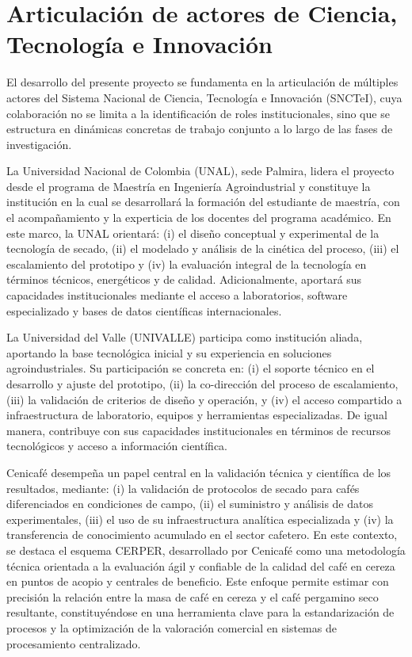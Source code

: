 \section{Articulación de actores de Ciencia, Tecnología e Innovación}

El desarrollo del presente proyecto se fundamenta en la articulación de múltiples 
actores del Sistema Nacional de Ciencia, Tecnología e Innovación (SNCTeI), cuya 
colaboración no se limita a la identificación de roles institucionales, sino que se 
estructura en dinámicas concretas de trabajo conjunto a lo largo de las fases de 
investigación.

La Universidad Nacional de Colombia (UNAL), sede Palmira, lidera el proyecto desde el 
programa de Maestría en Ingeniería Agroindustrial y constituye la institución en la cual 
se desarrollará la formación del estudiante de maestría, con el acompañamiento y la 
experticia de los docentes del programa académico. En este marco, la UNAL orientará: 
(i) el diseño conceptual y experimental de la tecnología de secado, (ii) el modelado y 
análisis de la cinética del proceso, (iii) el escalamiento del prototipo y (iv) la 
evaluación integral de la tecnología en términos técnicos, energéticos y de calidad. 
Adicionalmente, aportará sus capacidades institucionales mediante el acceso a laboratorios, 
software especializado y bases de datos científicas internacionales.

La Universidad del Valle (UNIVALLE) participa como institución aliada, aportando la base 
tecnológica inicial y su experiencia en soluciones agroindustriales. Su participación se 
concreta en: (i) el soporte técnico en el desarrollo y ajuste del prototipo, (ii) la 
co-dirección del proceso de escalamiento, (iii) la validación de criterios de diseño y 
operación, y (iv) el acceso compartido a infraestructura de laboratorio, equipos y 
herramientas especializadas. De igual manera, contribuye con sus capacidades institucionales 
en términos de recursos tecnológicos y acceso a información científica.

Cenicafé desempeña un papel central en la validación técnica y científica de los 
resultados, mediante: (i) la validación de protocolos de secado para cafés diferenciados 
en condiciones de campo, (ii) el suministro y análisis de datos experimentales, (iii) el 
uso de su infraestructura analítica especializada y (iv) la transferencia de conocimiento 
acumulado en el sector cafetero. En este contexto, se destaca el esquema CERPER, desarrollado 
por Cenicafé como una metodología técnica orientada a la evaluación ágil y confiable de la 
calidad del café en cereza en puntos de acopio y centrales de beneficio. Este enfoque permite 
estimar con precisión la relación entre la masa de café en cereza y el café pergamino seco 
resultante, constituyéndose en una herramienta clave para la estandarización de procesos y la 
optimización de la valoración comercial en sistemas de procesamiento centralizado.

